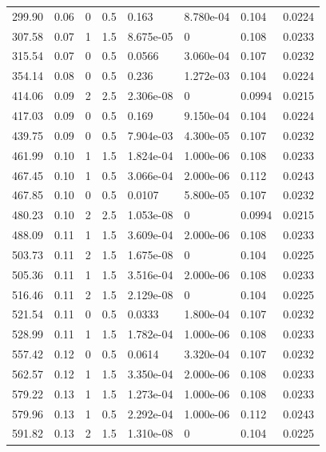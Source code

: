 \documentclass[preview]{standalone}
\begin{document}
{{\begin{tabular}{L{1.2cm}C{1.2cm} C{0.3cm}C{0.5cm} C{1.4cm}C{1.4cm} C{1.4cm}C{1.4cm}}
  299.90  &  0.06  & 0     & 0.5 &  0.163  & 8.780e-04  & 0.104 &  0.0224   \\ 
  307.58  &  0.07  & 1     & 1.5 &  8.675e-05  & 0  & 0.108 &  0.0233   \\ 
  315.54  &  0.07  & 0     & 0.5 &  0.0566  & 3.060e-04  & 0.107 &  0.0232   \\ 
  354.14  &  0.08  & 0     & 0.5 &  0.236  & 1.272e-03  & 0.104 &  0.0224   \\ 
  414.06  &  0.09  & 2     & 2.5 &  2.306e-08  & 0  & 0.0994 &  0.0215   \\ 
  417.03  &  0.09  & 0     & 0.5 &  0.169  & 9.150e-04  & 0.104 &  0.0224   \\ 
  439.75  &  0.09  & 0     & 0.5 &  7.904e-03  & 4.300e-05  & 0.107 &  0.0232   \\ 
  461.99  &  0.10  & 1     & 1.5 &  1.824e-04  & 1.000e-06  & 0.108 &  0.0233   \\ 
  467.45  &  0.10  & 1     & 0.5 &  3.066e-04  & 2.000e-06  & 0.112 &  0.0243   \\ 
  467.85  &  0.10  & 0     & 0.5 &  0.0107  & 5.800e-05  & 0.107 &  0.0232   \\ 
  480.23  &  0.10  & 2     & 2.5 &  1.053e-08  & 0  & 0.0994 &  0.0215   \\ 
  488.09  &  0.11  & 1     & 1.5 &  3.609e-04  & 2.000e-06  & 0.108 &  0.0233   \\ 
  503.73  &  0.11  & 2     & 1.5 &  1.675e-08  & 0  & 0.104 &  0.0225   \\ 
  505.36  &  0.11  & 1     & 1.5 &  3.516e-04  & 2.000e-06  & 0.108 &  0.0233   \\ 
  516.46  &  0.11  & 2     & 1.5 &  2.129e-08  & 0  & 0.104 &  0.0225   \\ 
  521.54  &  0.11  & 0     & 0.5 &  0.0333  & 1.800e-04  & 0.107 &  0.0232   \\ 
  528.99  &  0.11  & 1     & 1.5 &  1.782e-04  & 1.000e-06  & 0.108 &  0.0233   \\ 
  557.42  &  0.12  & 0     & 0.5 &  0.0614  & 3.320e-04  & 0.107 &  0.0232   \\ 
  562.57  &  0.12  & 1     & 1.5 &  3.350e-04  & 2.000e-06  & 0.108 &  0.0233   \\ 
  579.22  &  0.13  & 1     & 1.5 &  1.273e-04  & 1.000e-06  & 0.108 &  0.0233   \\ 
  579.96  &  0.13  & 1     & 0.5 &  2.292e-04  & 1.000e-06  & 0.112 &  0.0243   \\ 
  591.82  &  0.13  & 2     & 1.5 &  1.310e-08  & 0  & 0.104 &  0.0225   \\ 

\end{tabular}}}
\end{document}
